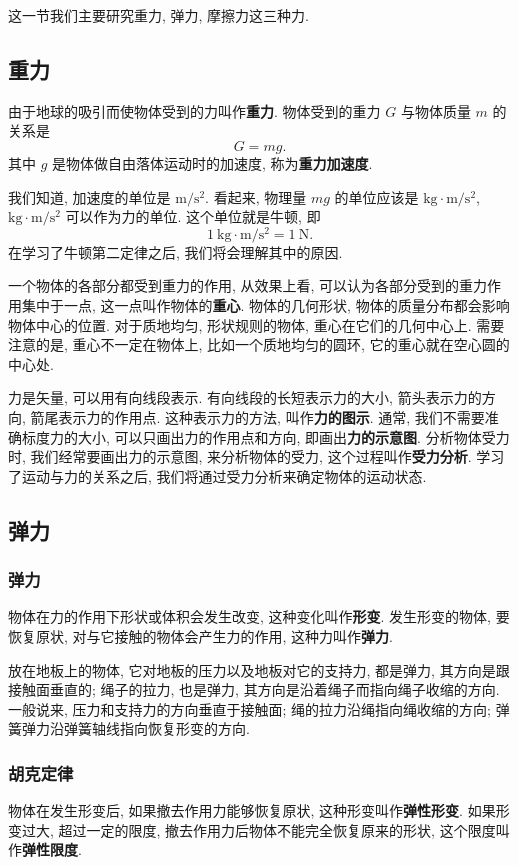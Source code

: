 \documentclass[UTF8,openany,fontset=fandol]{ctexbook}
\theoremstyle{chinesetextbook}
\newcommand{\unit}[1]{\ \mathrm{#1}}
\begin{document}
这一节我们主要研究重力, 弹力, 摩擦力这三种力.
\subsection{重力}
由于地球的吸引而使物体受到的力叫作\textbf{重力}. 物体受到的重力 $G$ 与物体质量 $m$ 的关系是
\[
G=mg.
\]
其中 $g$ 是物体做自由落体运动时的加速度, 称为\textbf{重力加速度}.

我们知道, 加速度的单位是 $\mathrm{m/s^2}$. 看起来, 物理量 $mg$ 的单位应该是 $\mathrm{kg\cdot m/s^2}$, $\mathrm{kg\cdot m/s^2}$ 可以作为力的单位. 这个单位就是牛顿, 即
\[
1\unit{kg\cdot m/s^2}=1\unit{N}.
\]
在学习了牛顿第二定律之后, 我们将会理解其中的原因.

一个物体的各部分都受到重力的作用, 从效果上看, 可以认为各部分受到的重力作用集中于一点, 这一点叫作物体的\textbf{重心}. 物体的几何形状, 物体的质量分布都会影响物体中心的位置. 对于质地均匀, 形状规则的物体, 重心在它们的几何中心上. 需要注意的是, 重心不一定在物体上, 比如一个质地均匀的圆环, 它的重心就在空心圆的中心处.

力是矢量, 可以用有向线段表示. 有向线段的长短表示力的大小, 箭头表示力的方向, 箭尾表示力的作用点. 这种表示力的方法, 叫作\textbf{力的图示}. 通常, 我们不需要准确标度力的大小, 可以只画出力的作用点和方向, 即画出\textbf{力的示意图}. 分析物体受力时, 我们经常要画出力的示意图, 来分析物体的受力, 这个过程叫作\textbf{受力分析}. 学习了运动与力的关系之后, 我们将通过受力分析来确定物体的运动状态.
\subsection{弹力}
\subsubsection{弹力}
物体在力的作用下形状或体积会发生改变, 这种变化叫作\textbf{形变}. 发生形变的物体, 要恢复原状, 对与它接触的物体会产生力的作用, 这种力叫作\textbf{弹力}.

放在地板上的物体, 它对地板的压力以及地板对它的支持力, 都是弹力, 其方向是跟接触面垂直的; 绳子的拉力, 也是弹力, 其方向是沿着绳子而指向绳子收缩的方向. 一般说来, 压力和支持力的方向垂直于接触面; 绳的拉力沿绳指向绳收缩的方向; 弹簧弹力沿弹簧轴线指向恢复形变的方向.
\subsubsection{胡克定律}
物体在发生形变后, 如果撤去作用力能够恢复原状, 这种形变叫作\textbf{弹性形变}. 如果形变过大, 超过一定的限度, 撤去作用力后物体不能完全恢复原来的形状, 这个限度叫作\textbf{弹性限度}.
\end{document}
